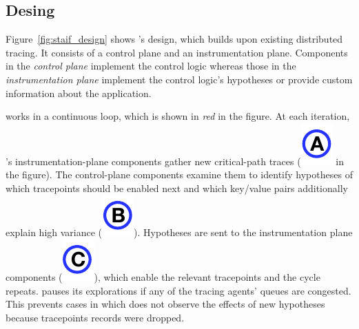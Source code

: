 \subsection{Desing}
Figure~\ref{fig:staif_design} shows \STAIF{}'s design, which builds
upon existing distributed tracing.  It consists of a
control plane and an instrumentation plane.  Components in the
\textit{control plane} implement the control logic whereas
those in the \textit{instrumentation plane} implement the control
logic's hypotheses or provide custom information about the
application.

\STAIF{} works in a continuous loop, which is shown in \textit{red}
in the figure.  At each iteration, \STAIF{}'s instrumentation-plane
components gather new critical-path traces (\includegraphics[scale=0.5, trim=-0 0.3cm 0 0]{figures/marked_A.pdf} in the figure).
The control-plane components examine them to identify hypotheses of
which tracepoints should be enabled next and which key/value pairs
additionally explain high variance (\includegraphics[scale=0.5, trim=-0 0.3cm 0 0]{figures/marked_B.pdf}).  Hypotheses are sent to
the instrumentation plane components (\includegraphics[scale=0.5, trim=-0 0.3cm 0 0]{figures/marked_C.pdf}), which enable the
relevant tracepoints and the cycle repeats. \STAIF{}
pauses its explorations if any of the tracing agents' queues are
congested.  This prevents cases in which \STAIF{} does not observe the
effects of new hypotheses because tracepoints records were dropped.

